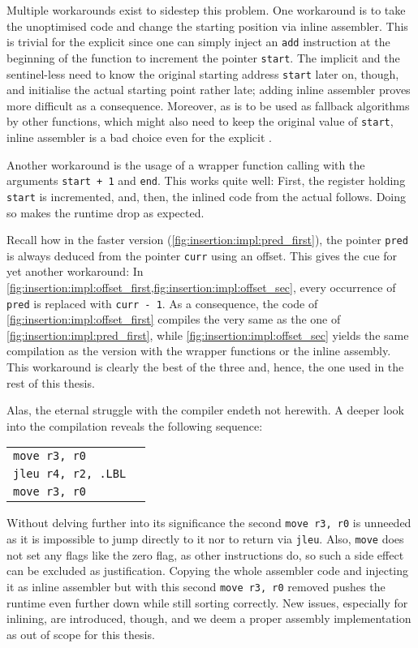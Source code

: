 Multiple workarounds exist to sidestep this problem.
One workaround is to take the unoptimised code and change the starting position via inline assembler.
This is trivial for the explicit \IS{} since one can simply inject an \lstinline|add| instruction at the beginning of the function to increment the pointer \lstinline|start|.
The implicit and the sentinel-less \IS*{} need to know the original starting address \lstinline|start| later on, though, and initialise the actual starting point rather late;
adding inline assembler proves more difficult as a consequence.
Moreover, as \IS{} is to be used as fallback algorithms by other functions, which might also need to keep the original value of \lstinline|start|, inline assembler is a bad choice even for the explicit \IS{}.

Another workaround is the usage of a wrapper function calling \IS{} with the arguments \lstinline|start + 1| and \lstinline|end|.
This works quite well:
First, the register holding \lstinline|start| is incremented, and, then, the inlined code from the actual \IS{} follows.
Doing so makes the runtime drop as expected.

Recall how in the faster version (\cref{fig:insertion:impl:pred_first}), the pointer \lstinline|pred| is always deduced from the pointer \lstinline|curr| using an offset.
This gives the cue for yet another workaround:
In \cref{fig:insertion:impl:offset_first,fig:insertion:impl:offset_sec}, every occurrence of \lstinline|pred| is replaced with \lstinline|curr - 1|.
As a consequence, the code of \cref{fig:insertion:impl:offset_first} compiles the very same as the one of \cref{fig:insertion:impl:pred_first}, while \cref{fig:insertion:impl:offset_sec} yields the same compilation as the version with the wrapper functions or the inline assembly.
This workaround is clearly the best of the three and, hence, the one used in the rest of this thesis.

Alas, the eternal struggle with the compiler endeth not herewith.
A deeper look into the compilation reveals the following sequence:
\begin{center}
	\begin{tabular}{ll}
		\lstinline|move r3, r0| & \makebox[0pt][l]{// copy content of register \lstinline|r0| to \lstinline|r3|}
		\\ \lstinline|jleu r4, r2, .LBL| & \makebox[0pt][l]{// jump to \lstinline|.LBL| if \lstinline|r4| \(\le\) \lstinline|r2|}
		\\ \lstinline|move r3, r0| &
	\end{tabular}
\end{center}
Without delving further into its significance \Dash the second \lstinline|move r3, r0| is unneeded as it is impossible to jump directly to it nor to return via \lstinline|jleu|.
Also, \lstinline|move| does not set any flags like the zero flag, as other instructions do, so such a side effect can be excluded as justification.
Copying the whole assembler code and injecting it as inline assembler but with this second \lstinline|move r3, r0| removed pushes the runtime even further down while still sorting correctly.
New issues, especially for inlining, are introduced, though, and we deem a proper assembly implementation as out of scope for this thesis.
